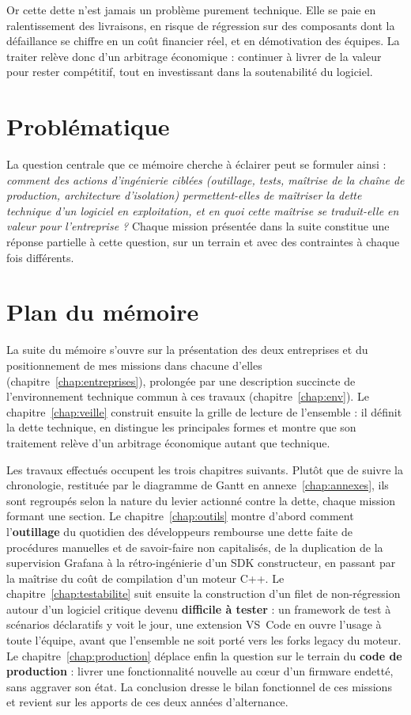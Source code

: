 Or cette dette n'est jamais un problème purement technique. Elle se paie en
ralentissement des livraisons, en risque de régression sur des composants
dont la défaillance se chiffre en un coût financier réel, et en démotivation des
équipes. La traiter relève donc d'un arbitrage économique : continuer à
livrer de la valeur pour rester compétitif, tout en investissant dans la
soutenabilité du logiciel.

\section{Problématique}
La question centrale que ce mémoire cherche à éclairer peut se formuler
ainsi : \emph{comment des actions d'ingénierie ciblées (outillage, tests,
maîtrise de la chaîne de production, architecture d'isolation) permettent-elles
de maîtriser la dette technique d'un logiciel en exploitation, et en quoi
cette maîtrise se traduit-elle en valeur pour l'entreprise ?} Chaque mission
présentée dans la suite constitue une réponse partielle à cette question, sur
un terrain et avec des contraintes à chaque fois différents.

\section{Plan du mémoire}
La suite du mémoire s'ouvre sur la présentation des deux entreprises et du
positionnement de mes missions dans chacune d'elles
(chapitre~\ref{chap:entreprises}), prolongée par une description succincte
de l'environnement technique commun à ces travaux
(chapitre~\ref{chap:env}). Le chapitre~\ref{chap:veille} construit ensuite
la grille de lecture de l'ensemble : il définit la dette technique, en
distingue les principales formes et montre que son traitement relève d'un
arbitrage économique autant que technique.

Les travaux effectués occupent les trois chapitres suivants. Plutôt que de
suivre la chronologie, restituée par le diagramme de Gantt en
annexe~\ref{chap:annexes}, ils sont regroupés selon la nature du levier
actionné contre la dette, chaque mission formant une section. Le
chapitre~\ref{chap:outils} montre d'abord comment l'\textbf{outillage} du
quotidien des développeurs rembourse une dette faite de procédures
manuelles et de savoir-faire non capitalisés, de la duplication de la
supervision Grafana à la rétro-ingénierie d'un SDK constructeur, en passant
par la maîtrise du coût de compilation d'un moteur C++. Le
chapitre~\ref{chap:testabilite} suit ensuite la construction d'un filet de
non-régression autour d'un logiciel critique devenu \textbf{difficile à
tester} : un framework de test à scénarios déclaratifs y voit le jour, une
extension VS~Code en ouvre l'usage à toute l'équipe, avant que l'ensemble
ne soit porté vers les forks legacy du moteur. Le
chapitre~\ref{chap:production} déplace enfin la question sur le terrain du
\textbf{code de production} : livrer une fonctionnalité nouvelle au cœur
d'un firmware endetté, sans aggraver son état. La conclusion dresse le
bilan fonctionnel de ces missions et revient sur les apports de ces deux
années d'alternance.

